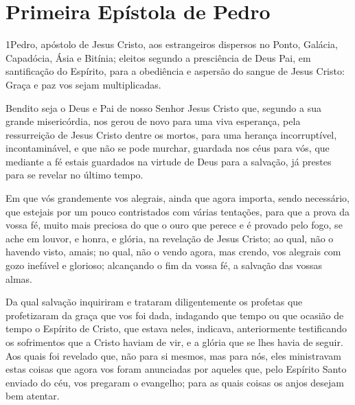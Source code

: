 \thispagestyle{empty}
\chapter*{Primeira Epístola de Pedro}

\lettrine{1} Pedro, apóstolo de Jesus Cristo, aos estrangeiros
dispersos no Ponto, Galácia, Capadócia, Ásia e Bitínia; eleitos
segundo a presciência de Deus Pai, em santificação do Espírito, para
a obediência e aspersão do sangue de Jesus Cristo: Graça e paz vos
sejam multiplicadas.

Bendito seja o Deus e Pai de nosso Senhor Jesus Cristo que,
segundo a sua grande misericórdia, nos gerou de novo para uma viva
esperança, pela ressurreição de Jesus Cristo dentre os mortos,
para uma herança incorruptível, incontaminável, e que não se
pode murchar, guardada nos céus para vós, que mediante a fé
estais guardados na virtude de Deus para a salvação, já prestes para
se revelar no último tempo.

Em que vós grandemente vos alegrais, ainda que agora importa,
sendo necessário, que estejais por um pouco contristados com várias
tentações, para que a prova da vossa fé, muito mais preciosa do
que o ouro que perece e é provado pelo fogo, se ache em louvor, e
honra, e glória, na revelação de Jesus Cristo; ao qual, não o
havendo visto, amais; no qual, não o vendo agora, mas crendo, vos
alegrais com gozo inefável e glorioso; alcançando o fim da vossa
fé, a salvação das vossas almas.

Da qual salvação inquiriram e trataram diligentemente os profetas
que profetizaram da graça que vos foi dada, indagando que
tempo ou que ocasião de tempo o Espírito de Cristo, que estava
neles, indicava, anteriormente testificando os sofrimentos que a
Cristo haviam de vir, e a glória que se lhes havia de seguir.
Aos quais foi revelado que, não para si mesmos, mas para nós,
eles ministravam estas coisas que agora vos foram anunciadas por
aqueles que, pelo Espírito Santo enviado do céu, vos pregaram o
evangelho; para as quais coisas os anjos desejam bem atentar.

